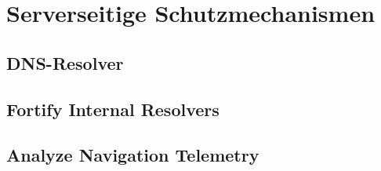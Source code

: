 











\section{Serverseitige Schutzmechanismen}

\subsection{DNS-Resolver}


\subsection{Fortify Internal Resolvers}

\subsection{Analyze Navigation Telemetry}
